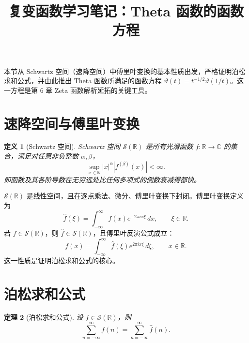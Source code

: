 \documentclass[UTF8]{ctexart}
\title{复变函数学习笔记：Theta 函数的函数方程}
\author{}
\date{}
\newtheorem{theorem}{定理}[section]
\newtheorem{definition}[theorem]{定义}
\numberwithin{equation}{section}
\newcommand{\RR}{\mathbb{R}}
\newcommand{\CC}{\mathbb{C}}
\begin{document}
\maketitle

本节从 Schwartz 空间（速降空间）中傅里叶变换的基本性质出发，严格证明泊松求和公式，并由此推出 Theta 函数所满足的函数方程 \(\vartheta(t) = t^{-1/2}\vartheta(1/t)\)。这一方程是第 6 章 Zeta 函数解析延拓的关键工具。

\section{速降空间与傅里叶变换}

\begin{definition}[Schwartz 空间]
Schwartz 空间 \(\mathcal{S}(\RR)\) 是所有光滑函数 \(f:\RR\to\CC\) 的集合，满足对任意非负整数 \(\alpha,\beta\)，
\begin{equation}\label{eq:Schwartz}
\sup_{x\in\RR} |x|^\alpha |f^{(\beta)}(x)| < \infty .
\end{equation}
即函数及其各阶导数在无穷远处比任何多项式的倒数衰减得都快。
\end{definition}

\(\mathcal{S}(\RR)\) 是线性空间，且在逐点乘法、微分、傅里叶变换下封闭。傅里叶变换定义为
\begin{equation}
\hat{f}(\xi) = \int_{-\infty}^{\infty} f(x) e^{-2\pi i x\xi}\,dx ,\qquad \xi\in\RR .
\end{equation}
若 \(f\in\mathcal{S}(\RR)\)，则 \(\hat{f}\in\mathcal{S}(\RR)\)，且傅里叶反演公式成立：
\begin{equation}
f(x) = \int_{-\infty}^{\infty} \hat{f}(\xi) e^{2\pi i x\xi}\,d\xi ,\qquad x\in\RR .
\end{equation}
这一性质是证明泊松求和公式的核心。

\section{泊松求和公式}

\begin{theorem}[泊松求和公式]\label{thm:Poisson}
设 \(f\in\mathcal{S}(\RR)\)，则
\begin{equation}\label{eq:Poisson}
\sum_{n=-\infty}^{\infty} f(n) = \sum_{n=-\infty}^{\infty} \hat{f}(n).
\end{equation}
\end{theorem}
\end{document}
